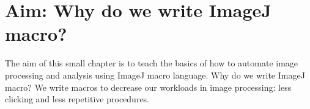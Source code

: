 \section{Aim: Why do we write ImageJ macro?}

The aim of this small chapter is to teach the basics of how to automate image processing and analysis using ImageJ macro language. Why do we write ImageJ macro? We write macros to decrease our workloads in image processing: less clicking and less repetitive procedures.